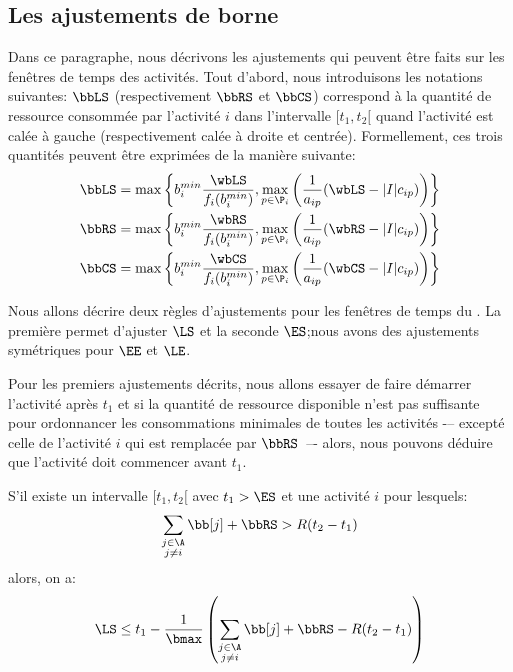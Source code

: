 \subsection{Les ajustements de borne}
\label{sec:adjustment_tw}

Dans ce paragraphe, nous décrivons les ajustements qui peuvent être
faits sur les fenêtres de temps des activités. Tout d'abord, nous
introduisons les notations suivantes: $\bbLS$ (respectivement $\bbRS$
et $\bbCS$) correspond à la quantité de ressource consommée par
l'activité $i$ dans l'intervalle $[t_1,t_2[$ quand l'activité est
calée à gauche (respectivement calée à droite et
centrée). Formellement, ces trois quantités peuvent être exprimées de
la manière suivante:
\begin{align}
  \bbLS&=   \max \left\{b_i^{min} \frac{\wbLS}{f_i(b_i^{min})},
         \max_{ p \in \P_i} \left(\frac{1}{a_{ip}}(\wbLS-|I|c_{ip})\right)\right\}\\
  \bbRS&=   \max \left\{b_i^{min} \frac{\wbRS}{f_i(b_i^{min})},
         \max_{ p \in \P_i} \left(\frac{1}{a_{ip}}(\wbRS-|I|c_{ip})\right)\right\}\\
  \bbCS&=  \max \left\{b_i^{min} \frac{\wbCS}{f_i(b_i^{min})},
         \max_{ p \in \P_i} \left(\frac{1}{a_{ip}}(\wbCS-|I|c_{ip})\right)\right\}
\end{align}

Nous allons décrire deux règles d'ajustements pour les fenêtres de
temps du \CECSP. La première permet d'ajuster $\LS$ et la seconde
$\ES$;nous avons des ajustements symétriques pour $\EE$ et $\LE$. 

Pour les premiers ajustements décrits, nous allons essayer de faire
démarrer l'activité après $t_1$ et si la quantité de ressource
disponible n’est pas suffisante pour ordonnancer les consommations
minimales de toutes les activités -– excepté celle de l’activité $i$ qui
est remplacée par $\bbRS$~–- alors, nous pouvons déduire que l’activité
doit commencer avant $t_1$.

\begin{reg}
  \label{reg:ajust_CECSP}
  S’il existe un intervalle $[t_1 , t_2 [$ avec $t_1 > \ES$ et une
  activité $i$ pour lesquels:
  \[ \sum_{\substack{j \in \A\\ j\neq i}} \bb[j] + \bbRS > R(t_2-t_1)
  \]
  alors, on a:
  \[ \LS \le t_1 - \frac{1}{\bmax}\left(\sum_{\substack{j \in \A\\ j\neq i}} \bb[j] + \bbRS - R(t_2-t_1)\right)
  \]
\end{reg}

